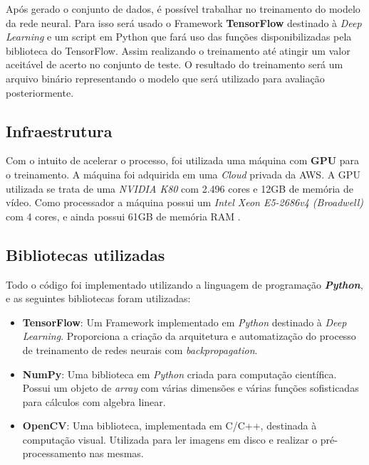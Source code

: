 Após gerado o conjunto de dados, é possível trabalhar no treinamento
do modelo da rede neural. Para isso será usado o Framework {\bf
  TensorFlow}\cite{TensorFlow} destinado à \textit{Deep Learning} e um
script em Python que fará uso das funções disponibilizadas pela
biblioteca do TensorFlow. Assim realizando o treinamento até atingir
um valor aceitável de acerto no conjunto de teste. O resultado do
treinamento será um arquivo binário representando o modelo que será
utilizado para avaliação posteriormente.

\subsection{Infraestrutura}

Com o intuito de acelerar o processo, foi utilizada uma
máquina com {\bf GPU} para o treinamento. A máquina foi adquirida em
uma \textit{Cloud} privada da AWS. A GPU utilizada se trata de uma
\textit{NVIDIA K80} com 2.496 cores e 12GB de memória de vídeo. Como
processador a máquina possui um \textit{Intel Xeon E5-2686v4
  (Broadwell)} com 4 cores, e ainda possui 61GB de memória RAM
\cite{GPUinstance}.

\subsection{Bibliotecas utilizadas}

Todo o código foi implementado utilizando a linguagem de programação
{\bf \emph{Python}}, e as seguintes bibliotecas foram utilizadas:

\begin{itemize}

\item {\bf TensorFlow}\cite{TensorFlow}: Um Framework implementado em
  \textit{Python} destinado à \textit{Deep Learning}. Proporciona a criação da
  arquitetura e automatização do processo de treinamento de redes
  neurais com \textit{backpropagation}.

\item {\bf NumPy}\cite{NumPy}: Uma biblioteca em \textit{Python}
  criada para computação científica. Possui um objeto de
  \textit{array} com várias dimensões e várias funções sofisticadas
  para cálculos com algebra linear.

\item {\bf OpenCV}\cite{OpenCV}: Uma biblioteca, implementada em
  C/C++, destinada à computação visual. Utilizada para ler imagens em
  disco e realizar o pré-processamento nas mesmas.

\end{itemize}

